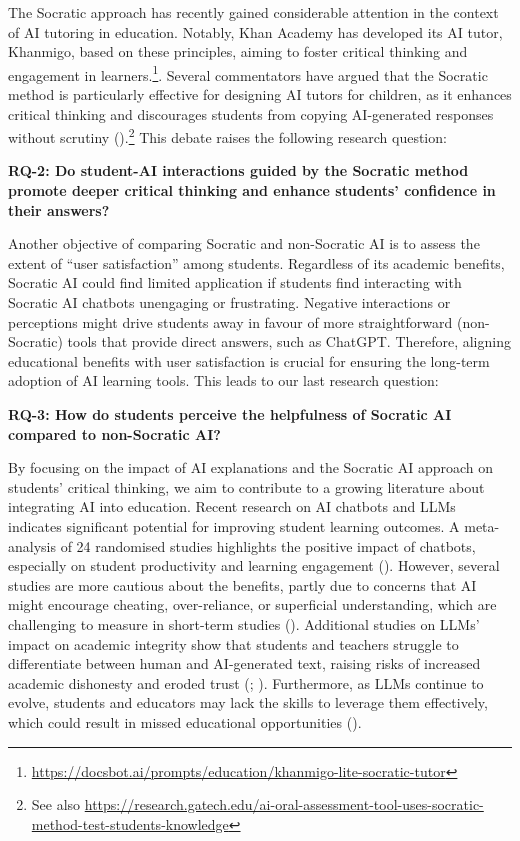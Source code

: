 \documentclass[
  11pt,
]{article}
\begin{document}
The Socratic approach has recently gained considerable attention in the context of AI tutoring in education. Notably, Khan Academy has developed its AI tutor, Khanmigo, based on these principles, aiming to foster critical thinking and engagement in learners.\footnote{\url{https://docsbot.ai/prompts/education/khanmigo-lite-socratic-tutor}}. Several commentators have argued that the Socratic method is particularly effective for designing AI tutors for children, as it enhances critical thinking and discourages students from copying AI-generated responses without scrutiny ().\footnote{See also \url{https://research.gatech.edu/ai-oral-assessment-tool-uses-socratic-method-test-students-knowledge}} This debate raises the following research question:

\textbf{RQ-2: Do student-AI interactions guided by the Socratic method promote deeper critical thinking and enhance students' confidence in their answers?}

Another objective of comparing Socratic and non-Socratic AI is to assess the extent of ``user satisfaction'' among students. Regardless of its academic benefits, Socratic AI could find limited application if students find interacting with Socratic AI chatbots unengaging or frustrating. Negative interactions or perceptions might drive students away in favour of more straightforward (non-Socratic) tools that provide direct answers, such as ChatGPT. Therefore, aligning educational benefits with user satisfaction is crucial for ensuring the long-term adoption of AI learning tools. This leads to our last research question:

\textbf{RQ-3: How do students perceive the helpfulness of Socratic AI compared to non-Socratic AI?}

By focusing on the impact of AI explanations and the Socratic AI approach on students' critical thinking, we aim to contribute to a growing literature about integrating AI into education. Recent research on AI chatbots and LLMs indicates significant potential for improving student learning outcomes. A meta-analysis of 24 randomised studies highlights the positive impact of chatbots, especially on student productivity and learning engagement (). However, several studies are more cautious about the benefits, partly due to concerns that AI might encourage cheating, over-reliance, or superficial understanding, which are challenging to measure in short-term studies (). Additional studies on LLMs' impact on academic integrity show that students and teachers struggle to differentiate between human and AI-generated text, raising risks of increased academic dishonesty and eroded trust (; ). Furthermore, as LLMs continue to evolve, students and educators may lack the skills to leverage them effectively, which could result in missed educational opportunities ().
\end{document}

